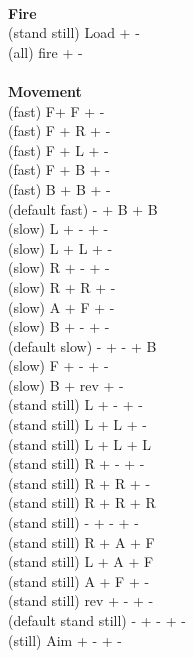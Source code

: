 \ \\ {\bf Fire } \\
(stand still) Load + - \\
(all) fire + - \\
\ \\ {\bf Movement } \\
(fast) F+ F + - \\
(fast) F + R + - \\
(fast) F + L + - \\
(fast) F + B + - \\
(fast) B + B + - \\
(default fast) - + B + B \\
(slow) L + - + - \\
(slow) L + L + - \\
(slow) R + - + - \\
(slow) R + R + - \\
(slow) A + F + - \\
(slow) B + - + - \\
(default slow)  - + - + B \\
(slow) F + - + - \\
(slow) B + rev + - \\
(stand still) L + - + - \\
(stand still) L + L + - \\
(stand still) L + L + L \\
(stand still) R + - + - \\
(stand still) R + R + - \\
(stand still) R + R + R \\
(stand still) - + - + - \\
(stand still) R + A + F \\
(stand still) L + A + F \\
(stand still) A + F + - \\
(stand still) rev + - + - \\
(default stand still) - + - + - \\
(still) Aim + - + - \\



